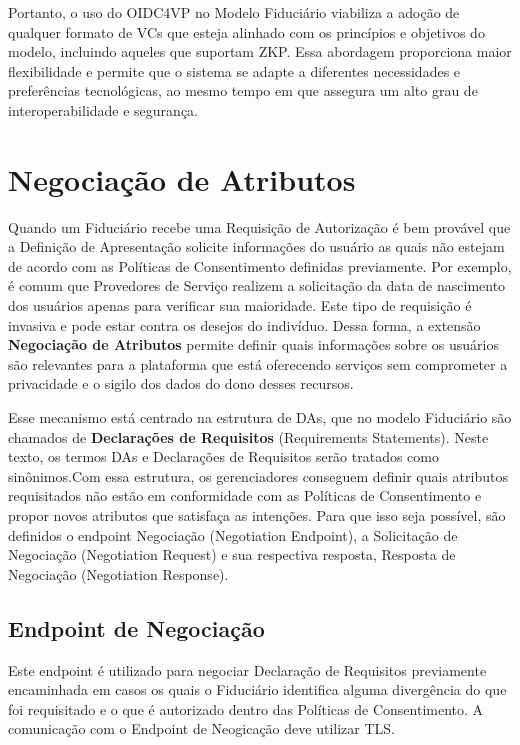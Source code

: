 Portanto, o uso do \acs{OIDC4VP} no Modelo Fiduciário viabiliza a adoção de qualquer formato de \acs{VC}s que esteja alinhado com os princípios e objetivos do modelo, incluindo aqueles que suportam \acs{ZKP}. Essa abordagem proporciona maior flexibilidade e permite que o sistema se adapte a diferentes necessidades e preferências tecnológicas, ao mesmo tempo em que assegura um alto grau de interoperabilidade e segurança.

\section{Negociação de Atributos}\label{section:attribute-negotiation}

Quando um Fiduciário recebe uma Requisição de Autorização é bem provável que a Definição de Apresentação solicite informações do usuário as quais não estejam de acordo com as Políticas de Consentimento definidas previamente. Por exemplo, é comum que Provedores de Serviço realizem a solicitação da data de nascimento dos  usuários apenas para verificar sua maioridade. Este tipo de requisição é invasiva e pode estar contra os desejos do indivíduo. Dessa forma, a extensão \textbf{Negociação de Atributos} permite definir quais informações sobre os usuários são relevantes para a plataforma que está oferecendo serviços sem comprometer a privacidade e o sigilo dos dados do dono desses recursos.

Esse mecanismo está centrado na estrutura de \acs{DA}s, que no modelo Fiduciário são chamados de \textbf{Declarações de Requisitos} (Requirements Statements). Neste texto, os termos \acs{DA}s e Declarações de Requisitos serão tratados como sinônimos.Com essa estrutura, os gerenciadores conseguem definir quais atributos requisitados não estão em conformidade com as Políticas de Consentimento e propor novos atributos que satisfaça as intenções. Para que isso seja possível, são definidos o endpoint Negociação (Negotiation Endpoint), a Solicitação de Negociação (Negotiation Request) e sua respectiva resposta, Resposta de Negociação (Negotiation Response). 

\subsection{Endpoint de Negociação}\label{subsection:endpoint-negociação}

Este endpoint é utilizado para negociar Declaração de Requisitos previamente encaminhada em casos os quais o Fiduciário identifica alguma divergência do que foi requisitado e o que é autorizado dentro das Políticas de Consentimento. A comunicação com o Endpoint de Neogicação deve utilizar TLS.

